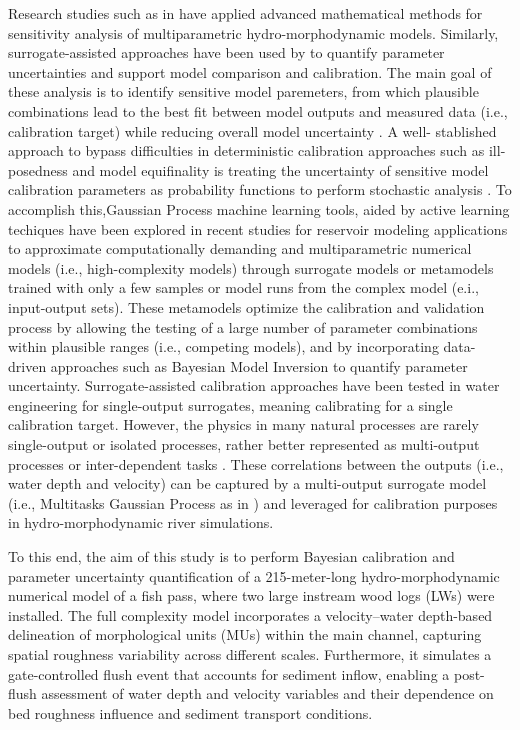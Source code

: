 \documentclass[draft,linenumbers,onecolumn]{agujournal2019} %
\begin{document}
Research studies such as in  have applied advanced mathematical methods for sensitivity analysis of multiparametric hydro-morphodynamic models. Similarly, surrogate-assisted approaches have been used by  \cite{mohammadi2018bayesian,beckers2020bayesian} to quantify parameter uncertainties and support model comparison and calibration. The main goal of these analysis is to identify sensitive model paremeters, from which plausible combinations lead to the best fit between model outputs and measured data (i.e., calibration target) while reducing overall model uncertainty \cite{oberkampf2004verification}. A well- stablished approach to bypass difficulties in deterministic calibration approaches such as ill-posedness and model equifinality is treating the uncertainty of sensitive model calibration parameters as probability functions to perform stochastic analysis \cite{kim2016stepwise}. To accomplish this,Gaussian Process machine learning tools, aided by active learning techiques have been explored in recent studies for reservoir modeling applications \cite{schwindt2023bayesian, mouris2023stability} to approximate computationally demanding and multiparametric numerical models (i.e., high-complexity models) through surrogate models or metamodels trained with only a few samples or model runs from the complex model (e.i., input-output sets). These metamodels optimize the calibration and validation process by allowing the testing of a large number of parameter combinations within plausible ranges (i.e., competing models), and by incorporating data-driven approaches such as Bayesian Model Inversion \cite{mohammadi2018bayesian} to quantify parameter uncertainty. Surrogate-assisted calibration approaches have been tested in water engineering for single-output surrogates, meaning calibrating for a single calibration target. However, the physics in many natural processes are rarely single-output or isolated processes, rather better represented as multi-output processes \cite{ferreira2022multioutput} or inter-dependent tasks \cite{bonilla2007multitask}. These correlations between the outputs (i.e., water depth and velocity) can be captured by a multi-output surrogate model (i.e., Multitasks Gaussian Process as in \cite{bonilla2007multitask}) and leveraged for calibration purposes in hydro-morphodynamic river simulations. 

% 
To this end, the aim of this study is to perform Bayesian calibration and parameter uncertainty quantification of a 215-meter-long hydro-morphodynamic numerical model of a fish pass, where two large instream wood logs (LWs) were installed. The full complexity model incorporates a velocity–water depth-based delineation of morphological units (MUs) within the main channel, capturing spatial roughness variability across different scales. Furthermore, it simulates a gate-controlled flush event that accounts for sediment inflow, enabling a post-flush assessment of water depth and velocity variables and their dependence on bed roughness influence and sediment transport conditions.
\end{document}
